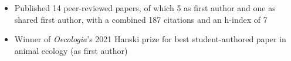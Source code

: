 


\begin{itemize}[noitemsep] 
  \item Published 14 peer-reviewed papers, of which 5 as first author and one as shared first author, with a combined 187 citations and an h-index of 7
  \item Winner of \textit{Oecologia}'s 2021 Hanski prize for best student-authored paper in animal ecology (as first author)
\end{itemize}